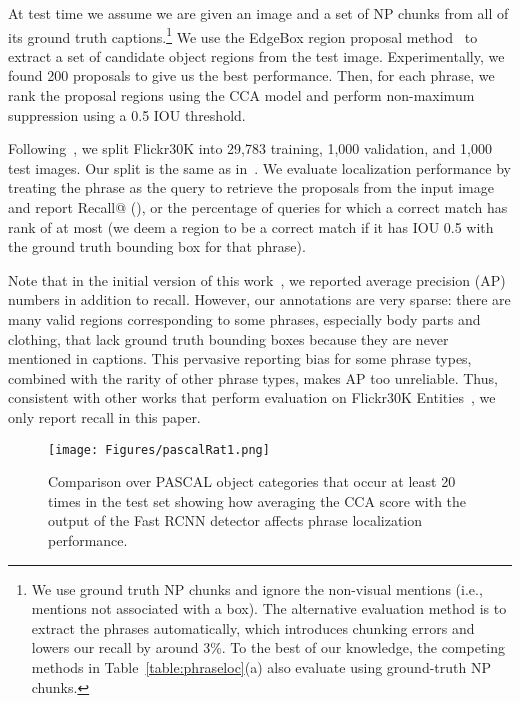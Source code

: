 \documentclass[twocolumn]{svjour3}
\begin{document}
At test time we assume we are given an image and a set of NP chunks from all of its ground truth captions.\footnote{We use ground truth NP chunks and ignore the non-visual mentions (i.e., mentions not associated with a box). The alternative evaluation method is to extract the phrases automatically, which introduces chunking errors and lowers our recall by around 3\%. To the best of our knowledge, the competing methods in Table~\ref{table:phraseloc}(a) also evaluate using ground-truth NP chunks.} We use the EdgeBox region proposal method~\citep{ZitnickECCV14} to extract a set of candidate object regions from the test image. Experimentally, we found 200 proposals to give us the best performance. Then, for each phrase, we rank the proposal regions using the CCA model and perform non-maximum suppression using a 0.5 IOU threshold.

Following~\citet{gong2014improving,karpathy2014deep,klein2014fisher,mao2014deep}, we split Flickr30K into 29,783 training, 1,000 validation, and 1,000 test images. Our split is the same as in~\citet{gong2014improving}. We evaluate localization performance by treating the phrase as the query to retrieve the proposals from the input image and report Recall@ (), or the percentage of queries for which a correct match has rank of at most  (we deem a region to be a correct match if it has IOU  0.5 with the ground truth bounding box for that phrase). 

Note that in the initial version of this work~\citep{flickrentities}, we reported average precision (AP) numbers in addition to recall. However, our annotations are very sparse: there are many valid regions corresponding to some phrases, especially body parts and clothing, that lack ground truth bounding boxes because they are never mentioned in captions. This pervasive reporting bias for some phrase types, combined with the rarity of other phrase types, makes AP too unreliable. Thus, consistent with other works that perform evaluation on Flickr30K Entities~\citep{fukui16emnlp,hu2016natural,rohrbach2015,wang2016matching}, we only report recall in this paper.







\begin{figure*}
\centering
\texttt{[image: Figures/pascalRat1.png]}
\caption{Comparison over PASCAL object categories that occur at least 20 times in the test set showing how averaging the CCA score with the output of the Fast RCNN detector affects phrase localization performance.
\label{fig:pascalObjects}}
\end{figure*}
\end{document}
